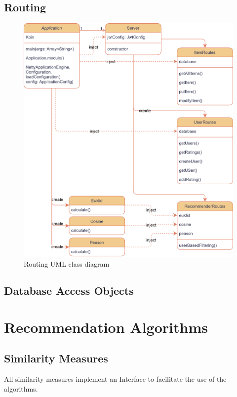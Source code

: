 \subsection{Routing}

\begin{figure}[ht]
\centering
\includegraphics[width=\textwidth]{images/RoutingUML.png}
\caption{\label{fig:routing}Routing UML class diagram}
\end{figure}


\subsection{Database Access Objects}

\section{Recommendation Algorithms}

\subsection{Similarity Measures}

All similarity measures implement an Interface to facilitate the use of the algorithms.

